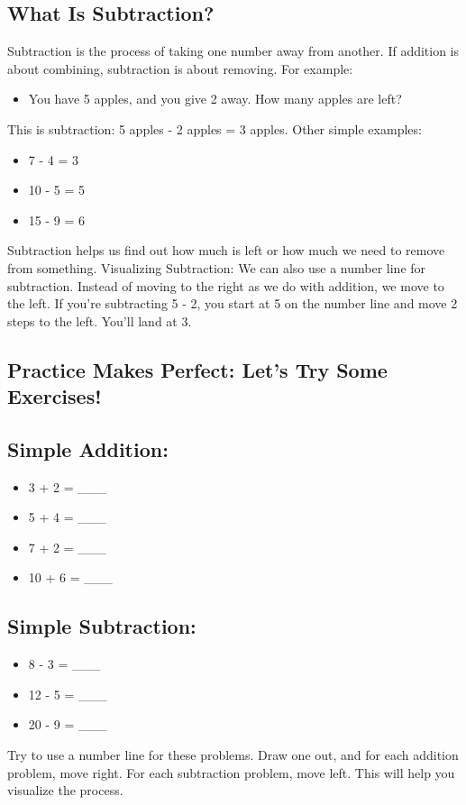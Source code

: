 \documentclass{book}
\begin{document}
\usetikzlibrary{arrows}
\subsection{What Is Subtraction?}
Subtraction is the process of taking one number away from another. If addition is about combining, subtraction is about removing.
For example:
\begin{itemize}
	\item You have 5 apples, and you give 2 away. How many apples are left?
\end{itemize}
This is subtraction: 5 apples - 2 apples = 3 apples.
Other simple examples:
\begin{itemize}
	\item 7 - 4 = 3
	\item 10 - 5 = 5
	\item 15 - 9 = 6
\end{itemize}
Subtraction helps us find out how much is left or how much we need to remove from something.
Visualizing Subtraction: We can also use a number line for subtraction. Instead of moving to the right as we do with addition, we move to the left.
If you’re subtracting 5 - 2, you start at 5 on the number line and move 2 steps to the left. You’ll land at 3.

\subsection{Practice Makes Perfect: Let’s Try Some Exercises!}
\subsection{Simple Addition:}
\begin{itemize}
	\item 3 + 2 = \_\_\_
	\item 5 + 4 = \_\_\_
	\item 7 + 2 = \_\_\_
	\item 10 + 6 = \_\_\_
\end{itemize}
\subsection{Simple Subtraction:}
\begin{itemize}
	\item 8 - 3 = \_\_\_
	\item 12 - 5 = \_\_\_
	\item 20 - 9 = \_\_\_
\end{itemize}
Try to use a number line for these problems. Draw one out, and for each addition problem, move right. For each subtraction problem, move left. This will help you visualize the process.
\end{document}
